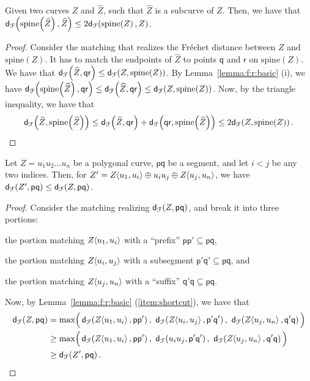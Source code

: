 \documentclass[12pt]{article}
\newcommand{\lemlab}[1]{\label{lemma:#1}}
\newcommand{\lemref}[1]{Lemma~\ref{lemma:#1}}
\newcommand{\itemref}[1]{(\ref{item:#1})}
\newcommand{\aftermathA}{\par\vspace{-\baselineskip}}
\newcommand{\ts}{\hspace{0.6pt}}
\newcommand{\Frechet}{Fr\'{e}c{h}e{}t\xspace}\providecommand{\Arr}{\mathop{\mathrm{\EuScript{A}}}}
\newcommand{\distFr}[2]{\mathsf{d}_{\EuScript{F}}\pth{#1, #2}}
\newcommand{\pnt}{\mathsf{p}}
\newcommand{\pntA}{\mathsf{q}}
\newcommand{\pntB}{\mathsf{r}}
\newcommand{\cZ}{{Z}}
\providecommand{\pth}[2][\!]{#1\left({#2}\right)}
\providecommand{\MakeBig}{\rule[-.2cm]{0cm}{0.4cm}}
\providecommand{\MakeBig}{\rule[-.2cm]{0cm}{0.4cm}}
\newcommand{\concatOp}{\oplus}
\newcommand{\SC}[3]{{#1}\!\!\ts\ts \left\langle  #2, #3 \right\rangle}
\newcommand{\spineX}[1]{\mathrm{s{}p{}i{}n{}e}\pth{#1}}
\numberwithin{figure}{section}
\numberwithin{equation}{section}
\newcommand{\matching}{matching\xspace}
\newcommand{\cubcZ}{\widehat{\cZ}}
\begin{document}
\begin{lemma}\lemlab{monotone:subcurve}Given two curves $\cZ$ and $\cubcZ$, such that $\cubcZ$ is a
    subcurve of $\cZ$.  Then, we have that
    $\distFr{\spineX{\cubcZ}}{\cubcZ} \leq 2
    \distFr{\spineX{\cZ}}{\cZ}$.
\end{lemma}


\begin{proof}
    Consider the \matching{} that realizes the \Frechet distance
    between $\cZ$ and $\spineX{\cZ}$. It has to match the endpoints of
    $\cubcZ$ to points $\pntA$ and $\pntB$ on $\spineX{\cZ}$.  We have
    that $\distFr{\cubcZ}{{\pntA\pntB}} \leq
    \distFr{\cZ}{\spineX{\cZ}}$.  By \lemref{f:r:basic} (i), we have
    $\distFr{\spineX{\cubcZ}}{{\pntA\pntB}} \leq
    \distFr{\cubcZ}{{\pntA\pntB}} \leq \distFr{\cZ}{\spineX{\cZ}}$.
    Now, by the triangle inequality, we have that
    \begin{align*}
        \distFr{\cubcZ}{\spineX{\cubcZ}} \leq
        \distFr{\cubcZ}{{\pntA\pntB}} +
        \distFr{{\pntA\pntB}}{\spineX{\cubcZ}} \leq 2
        \distFr{\cZ}{\spineX{\cZ}}.
    \end{align*}
    \aftermathA
\end{proof}

\begin{lemma}
    \lemlab{shortcut:segment}Let $\cZ = u_1 u_2 \ldots u_n$ be a polygonal curve, $\pnt \pntA$
    be a segment, and let $i < j$ be any two indices. Then, for $\cZ'
    = \SC{\cZ}{u_1}{u_i} \concatOp u_i u_j \concatOp
    \SC{\cZ}{u_j}{u_n}$, we have $\distFr{\cZ'}{ \pnt \pntA} \leq
    \distFr{\cZ}{ \pnt \pntA}$.
\end{lemma}

\begin{proof}
    Consider the \matching{} realizing $\distFr{\cZ}{ \pnt \pntA}$,
    and break it into three portions:
    \begin{compactitem}
        \item the portion matching $\SC{\cZ}{u_1}{u_i}$ with a
        ``prefix'' $\pnt\pnt' \subseteq \pnt\pntA$,
        \item the portion matching $\SC{\cZ}{u_i}{u_j}$ with a
        subsegment $\pnt'\pntA' \subseteq \pnt\pntA$, and
        \item the portion matching $\SC{\cZ}{u_j}{u_n}$ with a
        ``suffix'' $\pntA'\pntA \subseteq \pnt\pntA$.
    \end{compactitem}
    Now, by \lemref{f:r:basic} \itemref{shortcut}, we have that
    \begin{align*}
        \distFr{\cZ}{ \pnt \pntA}&=\max \pth{\MakeBig \,\distFr{\SC{\cZ}{u_1}{u_i}}{\pnt \pnt'}, \, \,\distFr{\SC{\cZ}{u_i}{u_j}}{\pnt' \pntA'},\, \,\distFr{\SC{\cZ}{u_j}{u_n}}{\pntA' \pntA}\,}\\&\geq \max \pth{\MakeBig \, \distFr{\SC{\cZ}{u_1}{u_i}}{\pnt \pnt'},\, \, \distFr{u_i u_j }{\pnt' \pntA'},\, \, \distFr{\SC{\cZ}{u_j}{u_n}}{\pntA' \pntA}\, }\\&\geq \distFr{\cZ'}{\pnt \pntA}.
    \end{align*}
    \aftermathA
\end{proof}
\end{document}
